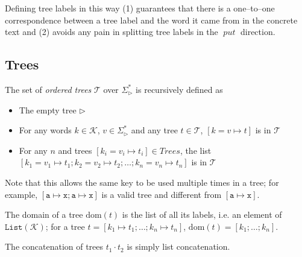 \documentclass[12pt,fleqn]{amsart}
\newcommand{\ensmath}[1]{\ensuremath{#1}\xspace}
\newcommand{\opnam}[1]{\ensmath{\operatorname{\mathit{#1}}}}
\newcommand{\nput}{\opnam{put}}
\newcommand{\tree}[1]{\ensmath{[#1]}}
\newcommand{\conc}[2]{\ensmath{#1\cdot #2}}
\newcommand{\Trees}{\ensmath{\mathcal T}}
\newcommand{\Words}{\ensmath{\Sigma^*_{\rhd}}}
\newcommand{\tmap}[2]{\ensmath{#1\mapsto #2}}
\newcommand{\tmapv}[3]{\ensmath{#1 = #2\mapsto #3}}
\newcommand{\tmaptt}[2]{\ensmath{{\mathtt #1}\mapsto {\mathtt #2}}}
\newcommand{\dom}[1]{\ensmath{\mathrm{dom}(#1)}}
\newcommand{\List}[1]{\ensmath{\mathtt{List(#1)}}}
\newcommand{\Keys}{\ensmath{\mathcal{K}}}
\begin{document}
Defining tree labels in this way (1) guarantees that there is a
one--to--one correspondence between a tree label and the word it came from
in the concrete text and (2) avoids any pain in splitting tree labels in
the \nput direction.

\subsection{Trees}
The set of \emph{ordered trees} \Trees over $\Words$ is recursively
defined as
\begin{itemize}
\item The empty tree $\rhd$
\item For any words $k\in\Keys$, $v\in\Words$ and any tree $t\in\Trees$,
  $\tree{\tmapv{k}{v}{t}}$ is in \Trees
\item For any $n$ and trees $\tree{\tmapv{k_i}{v_i}{t_i}} \in Trees$,
  the list
  $[\tmapv{k_1}{v_1}{t_1};\tmapv{k_2}{v_2}{t_2};\ldots;\tmapv{k_n}{v_n}{t_n}]$
  is in \Trees
\end{itemize}

Note that this allows the same key to be used multiple times in a tree; for
example, $[\tmaptt{a}{x}; \tmaptt{a}{x}]$ is a valid tree and
different from $[\tmaptt{a}{x}]$.

The domain of a tree $\dom{t}$ is the list of all its labels, i.e. an
element of $\List{\Keys}$; for a tree $t =
\tree{\tmap{k_1}{t_1};\ldots;\tmap{k_n}{t_n}}$, $\dom{t} =
     [k_1;\ldots;k_n].$

%

The concatenation of trees $\conc{t_1}{t_2}$ is simply list concatenation.
\end{document}
